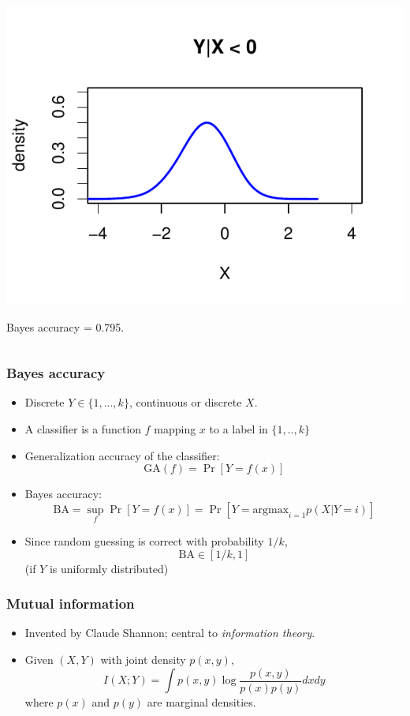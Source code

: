 \documentclass{beamer}
\begin{document}
\begin{frame}
\begin{columns}
\begin{column}{0.5\textwidth}
\begin{center}
\includegraphics[scale = 0.4, clip = true, trim = 0.1in 0.1in 0.1in 0.2in]{../diagram/ddi_2c.pdf}
\end{center}

Bayes accuracy = 0.795.
\end{column}
\end{columns}
\end{frame}

\begin{frame}
\frametitle{Bayes accuracy}
\begin{itemize}
\item Discrete $Y \in \{1,...,k\}$, continuous or discrete $X$.
\item A classifier is a function $f$ mapping $x$ to a label in $\{1,..,k\}$
\item Generalization accuracy of the classifier:
\[
\text{GA}(f) = \Pr[Y = f(x)]
\]
\item Bayes accuracy:
\[
\text{BA} = \sup_f \Pr[Y = f(x)] = \Pr[Y = \text{argmax}_{i=1} p(X|Y=i)]
\]
\item Since random guessing is correct with probability $1/k$,
\[
\text{BA} \in [1/k, 1]
\]
(if $Y$ is uniformly distributed)
\end{itemize}
\end{frame}


\begin{frame}
\frametitle{Mutual information}
\begin{itemize}
\item Invented by Claude Shannon; central to \emph{information theory}.
\item Given $(X, Y)$ with joint density $p(x, y)$,
\[
I(X; Y) = \int p(x, y) \log\frac{p(x, y)}{p(x) p(y)} dx dy
\]
where $p(x)$ and $p(y)$ are marginal densities.
\end{itemize}
\end{frame}
\end{document}
